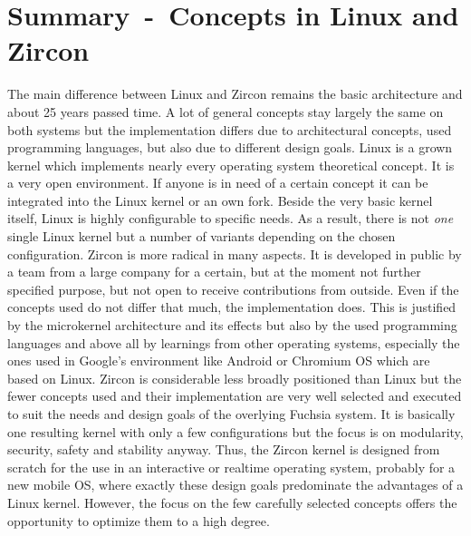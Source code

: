 \section{Summary~-~Concepts in Linux and Zircon}
The main difference between Linux and Zircon remains the basic architecture and about 25 years passed time.
A lot of general concepts stay largely the same on both systems but the implementation differs due to architectural concepts, used programming languages, but also due to different design goals.
Linux is a grown kernel which implements nearly every operating system theoretical concept.
It is a very open environment.
If anyone is in need of a certain concept it can be integrated into the Linux kernel or an own fork.
Beside the very basic kernel itself, Linux is highly configurable to specific needs.
As a result, there is not \textit{one} single Linux kernel but a number of variants depending on the chosen configuration.
Zircon is more radical in many aspects.
It is developed in public by a team from a large company for a certain, but at the moment not further specified purpose, but not open to receive contributions from outside.
Even if the concepts used do not differ that much, the implementation does.
This is justified by the microkernel architecture and its effects but also by the used programming languages and above all by learnings from other operating systems, especially the ones used in Google's environment like Android or Chromium OS which are based on Linux.
Zircon is considerable less broadly positioned than Linux but the fewer concepts used and their implementation are very well selected and executed to suit the needs and design goals of the overlying Fuchsia system. 
It is basically one resulting kernel with only a few configurations but the focus is on modularity, security, safety and stability anyway\cite{chat-zircon-arch}.
Thus, the Zircon kernel is designed from scratch for the use in an interactive or realtime operating system, probably for a new mobile OS, where exactly these design goals predominate the advantages of a Linux kernel. 
However, the focus on the few carefully selected concepts offers the opportunity to optimize them to a high degree.



